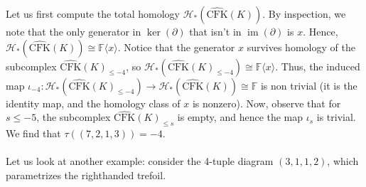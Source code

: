 \documentclass[reqno, 12pt]{amsart}
\theoremstyle{remark}
\begin{document}
Let us first compute the total homology $\mathcal{H}_{*}(\widehat{\text{CFK}}(K))$. By inspection, we note that the only generator in $\ker(\partial)$ that isn't in $\operatorname{im}(\partial)$ is $x$. Hence, $\mathcal{H}_{*}(\widehat{\text{CFK}}(K)) \cong \mathbb{F}\langle x \rangle$. Notice that the generator $x$ survives homology of the subcomplex $\widehat{\text{CFK}}(K)_{\le -4}$, so $\mathcal{H}_{*}(\widehat{\text{CFK}}(K)_{\le -4}) \cong \mathbb{F}\langle x \rangle$. Thus, the induced map $\iota_{-4} \colon  \mathcal{H}_{*}(\widehat{\text{CFK}}(K)_{\le -4}) \to \mathcal{H}_{*}(\widehat{\text{CFK}}(K)) \cong \mathbb{F}$ is non trivial (it is the identity map, and the homology class of $x$ is nonzero). Now, observe that for $s \le -5$, the subcomplex $\widehat{\text{CFK}}(K)_{\le s}$ is empty, and hence the map $\iota_s$ is trivial. We find that $\tau((7, 2, 1, 3)) = -4$. \\
\\
Let us look at another example: consider the 4-tuple diagram $(3, 1, 1, 2)$, which parametrizes the righthanded trefoil.
\end{document}
